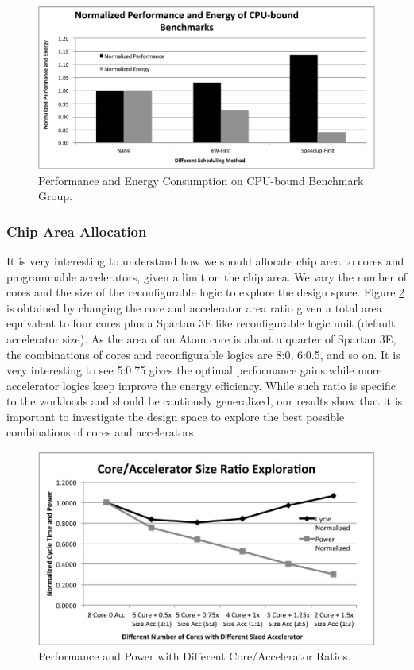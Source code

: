 \begin{figure}
    \centering
    \includegraphics[width=4.5in]{CPU-Bounded}
    \caption{Performance and Energy Consumption on CPU-bound Benchmark Group.}
    \label{fig_cpu_bound}
\end{figure}


\subsubsection{Chip Area Allocation}

It is very interesting to understand how we should allocate chip
area to cores and programmable accelerators, given a limit on the chip
area. We vary the number of cores and the size of the
reconfigurable logic to explore the design space. Figure
\ref{fig_core_acc_ratio} is obtained by changing the core and
accelerator area ratio given a total area equivalent to four cores
plus a Spartan 3E like reconfigurable logic unit (default
accelerator size). As the area of an Atom core is about
    a quarter of Spartan 3E, the combinations of cores and reconfigurable
logics are 8:0, 6:0.5, and so on. It is very interesting to see
 5:0.75 gives the optimal performance gains while more accelerator
logics keep improve the energy efficiency. While such ratio is
specific to the workloads and should be cautiously generalized, 
our results show that it is important to
investigate the design space to explore the best possible
combinations of cores and accelerators. 

\begin{figure}
    \centering
    \includegraphics[width=4.5in]{Core-Acc-Size-Ratio}
    \caption{Performance and Power with Different Core/Accelerator Ratios.}
    \label{fig_core_acc_ratio}
\end{figure}

